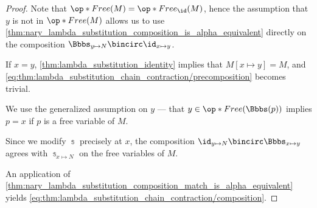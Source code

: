 \begin{proof}
   Note that \( \op*{Free}(M) = \op*{Free}_{\id}(M) \), hence the assumption that \( y \) is not in \( \op*{Free}(M) \) allows us to use \cref{thm:nary_lambda_substitution_composition_is_alpha_equivalent} directly on the composition \( \Bbbs_{y \mapsto N} \bincirc \id_{x \mapsto y} \).

  If \( x = y \), \cref{thm:lambda_substitution_identity} implies that \( M[x \mapsto y] = M \), and \eqref{eq:thm:lambda_substitution_chain_contraction/precomposition} becomes trivial.

   We use the generalized assumption on \( y \) --- that \( y \in \op*{Free}(\Bbbs(p)) \) implies \( p = x \) if \( p \) is a free variable of \( M \).

  Since we modify \( \Bbbs \) precisely at \( x \), the composition \( \id_{y \mapsto N} \bincirc \Bbbs_{x \mapsto y} \) agrees with \( \Bbbs_{x \mapsto N} \) on the free variables of \( M \).

  An application of \cref{thm:nary_lambda_substitution_composition_match_is_alpha_equivalent} yields \eqref{eq:thm:lambda_substitution_chain_contraction/composition}.
\end{proof}

